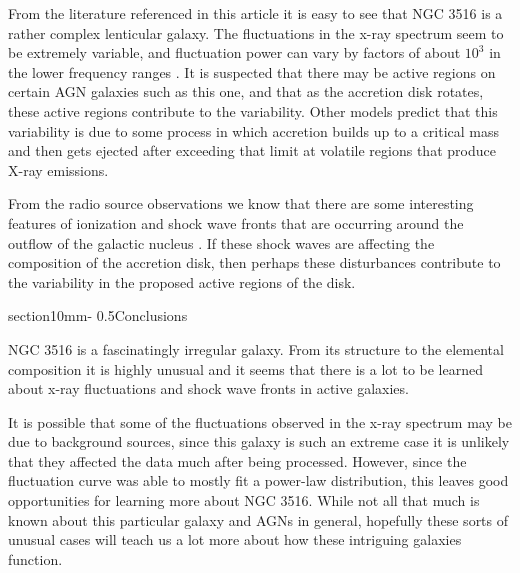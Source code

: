 \documentclass[letterpaper,11pt,twocolumn]{article}
\makeatletter
\renewcommand{\section}{\@startsection%
{section}{1}{0mm}{-\baselineskip}%
{0.5\baselineskip}{\normalfont\Large\bfseries}}%
\makeatother
\begin{document}
From the literature referenced in this article it is easy to see that NGC 3516 is a rather complex lenticular galaxy. The fluctuations in the x-ray spectrum seem to be extremely variable, and fluctuation power can vary by factors of about $10^3$ in the lower frequency ranges {\it \citet{EN+18}}. It is suspected that there may be active regions on certain AGN galaxies such as this one, and that as the accretion disk rotates, these active regions contribute to the variability. Other models predict that this variability is due to some process in which accretion builds up to a critical mass and then gets ejected after exceeding that limit at volatile regions that produce X-ray emissions.

From the radio source observations we know that there are some interesting features of ionization and shock wave fronts that are occurring around the outflow of the galactic nucleus {\it \citet{MWP+17}}. If these shock waves are affecting the composition of the accretion disk, then perhaps these disturbances contribute to the variability in the proposed active regions of the disk.






\section{Conclusions}

NGC 3516 is a fascinatingly irregular galaxy. From its structure to the elemental composition it is highly unusual and it seems that there is a lot to be learned about x-ray fluctuations and shock wave fronts in active galaxies. 

It is possible that some of the fluctuations observed in the x-ray spectrum may be due to background sources, since this galaxy is such an extreme case it is unlikely that they affected the data much after being processed. However, since the fluctuation curve was able to mostly fit a power-law distribution, this leaves good opportunities for learning more about NGC 3516. While not all that much is known about this particular galaxy and AGNs in general, hopefully these sorts of unusual cases will teach us a lot more about how these intriguing galaxies function.



\end{document}
